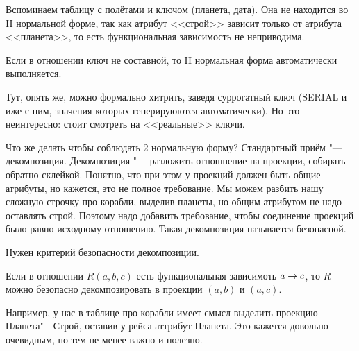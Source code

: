 	\begin{exmp}
		Вспоминаем таблицу с полётами и ключом (планета, дата).
		Она не находится во II нормальной форме, так как атрибут <<строй>> зависит только
		от атрибута <<планета>>, то есть функциональная зависимость не неприводима.
	\end{exmp}
	\begin{Rem}
		Если в отношении ключ не составной, то II нормальная форма автоматически выполняется.
	\end{Rem}
	\begin{Rem}
		Тут, опять же, можно формально хитрить, заведя суррогатный ключ (SERIAL и иже с ним, значения которых генерируюются автоматически).
		Но это неинтересно: стоит смотреть на <<реальные>> ключи.
	\end{Rem}
Что же делать чтобы соблюдать 2 нормальную форму?
Стандартный приём "--- декомпозиция.
Декомпозиция "--- разложить отношнение на проекции, собирать обратно склейкой.
Понятно, что при этом у проекций должен быть общие атрибуты, но кажется, это не полное требование.
Мы можем разбить нашу сложную строчку про корабли, выделив планеты, но общим атрибутом не надо оставлять строй.
Поэтому надо добавить требование, чтобы соединение проекций было равно исходному отношению.
Такая декомпозиция называется безопасной.

Нужен критерий безопасности декомпозиции.
\begin{theorem}
	Если в отношении $R(a, b, c)$ есть функциональная зависимоть $a \rightarrow c$,
	то $R$ можно безопасно декомпозировать в проекции $(a, b)$ и $(a, c)$.
\end{theorem}
Например, у нас в таблице про корабли имеет смысл выделить проекцию Планета"---Строй, оставив у рейса аттрибут Планета.
Это кажется довольно очевидным, но тем не менее важно и полезно.
